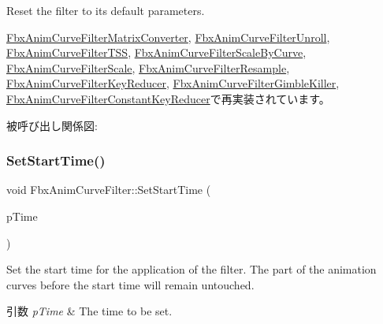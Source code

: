 Reset the filter to its default parameters. 

\hyperlink{class_fbx_anim_curve_filter_matrix_converter_ad441f2753722fa3fd07631fb249afadb}{Fbx\+Anim\+Curve\+Filter\+Matrix\+Converter}, \hyperlink{class_fbx_anim_curve_filter_unroll_a0587dd664dddb98a809043f030b409d6}{Fbx\+Anim\+Curve\+Filter\+Unroll}, \hyperlink{class_fbx_anim_curve_filter_t_s_s_aebf5798bd833f7dced2a11aea61b1c35}{Fbx\+Anim\+Curve\+Filter\+T\+SS}, \hyperlink{class_fbx_anim_curve_filter_scale_by_curve_afa7aab42520287edf327d78dcbbb0d01}{Fbx\+Anim\+Curve\+Filter\+Scale\+By\+Curve}, \hyperlink{class_fbx_anim_curve_filter_scale_a40e82207d205b026aaab40e52a7184c8}{Fbx\+Anim\+Curve\+Filter\+Scale}, \hyperlink{class_fbx_anim_curve_filter_resample_a149622ab0dd1ffd26ca1e59f31aaed93}{Fbx\+Anim\+Curve\+Filter\+Resample}, \hyperlink{class_fbx_anim_curve_filter_key_reducer_a52e9e7476a3c4e55ad7c41c978b92cd5}{Fbx\+Anim\+Curve\+Filter\+Key\+Reducer}, \hyperlink{class_fbx_anim_curve_filter_gimble_killer_ad0c8bbf400bc208412b088d9c5b702a5}{Fbx\+Anim\+Curve\+Filter\+Gimble\+Killer}, \hyperlink{class_fbx_anim_curve_filter_constant_key_reducer_a6961f8cd2d86b3f0b0c503c021bac93b}{Fbx\+Anim\+Curve\+Filter\+Constant\+Key\+Reducer}で再実装されています。

被呼び出し関係図\+:
\mbox{\label{class_fbx_anim_curve_filter_ad5833e1664b9621b4bafef76944ad383}} 
\subsubsection{\texorpdfstring{Set\+Start\+Time()}{SetStartTime()}}
{\footnotesize\ttfamily void Fbx\+Anim\+Curve\+Filter\+::\+Set\+Start\+Time (\begin{DoxyParamCaption}\item[{\hyperlink{class_fbx_time}{Fbx\+Time} \&}]{p\+Time }\end{DoxyParamCaption})}

Set the start time for the application of the filter. The part of the animation curves before the start time will remain untouched. 
\begin{DoxyParams}{引数}
{\em p\+Time} & The time to be set. \\
\hline
\end{DoxyParams}
\mbox{\label{class_fbx_anim_curve_filter_a75fd5bf41a315dd12d8efb3184a17fc8}} 
